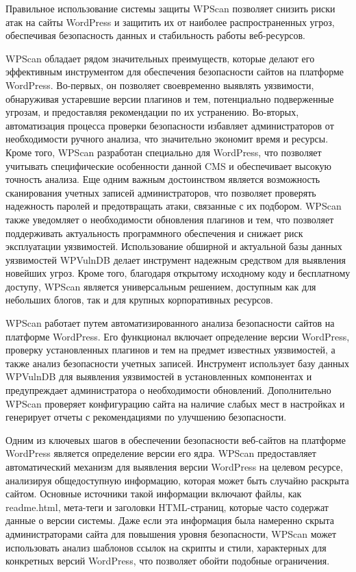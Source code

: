 \begin{multicols}{2}
Правильное использование системы защиты WPScan позволяет снизить риски
атак на сайты WordPress и защитить их от наиболее распространенных
угроз, обеспечивая безопасность данных и стабильность работы
веб-ресурсов.

WPScan обладает рядом значительных преимуществ, которые делают его
эффективным инструментом для обеспечения безопасности сайтов на
платформе WordPress. Во-первых, он позволяет своевременно выявлять
уязвимости, обнаруживая устаревшие версии плагинов и тем, потенциально
подверженные угрозам, и предоставляя рекомендации по их устранению.
Во-вторых, автоматизация процесса проверки безопасности избавляет
администраторов от необходимости ручного анализа, что значительно
экономит время и ресурсы. Кроме того, WPScan разработан специально для
WordPress, что позволяет учитывать специфические особенности данной CMS
и обеспечивает высокую точность анализа. Еще одним важным достоинством
является возможность сканирования учетных записей администраторов, что
позволяет проверять надежность паролей и предотвращать атаки, связанные
с их подбором. WPScan также уведомляет о необходимости обновления
плагинов и тем, что позволяет поддерживать актуальность программного
обеспечения и снижает риск эксплуатации уязвимостей. Использование
обширной и актуальной базы данных уязвимостей WPVulnDB делает инструмент
надежным средством для выявления новейших угроз. Кроме того, благодаря
открытому исходному коду и бесплатному доступу, WPScan является
универсальным решением, доступным как для небольших блогов, так и для
крупных корпоративных ресурсов.

WPScan работает путем автоматизированного анализа безопасности сайтов на
платформе WordPress. Его функционал включает определение версии
WordPress, проверку установленных плагинов и тем на предмет известных
уязвимостей, а также анализ безопасности учетных записей. Инструмент
использует базу данных WPVulnDB для выявления уязвимостей в
установленных компонентах и предупреждает администратора о необходимости
обновлений. Дополнительно WPScan проверяет конфигурацию сайта на наличие
слабых мест в настройках и генерирует отчеты с рекомендациями по
улучшению безопасности.

Одним из ключевых шагов в обеспечении безопасности веб-сайтов на
платформе WordPress является определение версии его ядра. WPScan
предоставляет автоматический механизм для выявления версии WordPress на
целевом ресурсе, анализируя общедоступную информацию, которая может быть
случайно раскрыта сайтом. Основные источники такой информации включают
файлы, как readme.html, мета-теги и заголовки HTML-страниц, которые
часто содержат данные о версии системы. Даже если эта информация была
намеренно скрыта администраторами сайта для повышения уровня
безопасности, WPScan может использовать анализ шаблонов ссылок на
скрипты и стили, характерных для конкретных версий WordPress, что
позволяет обойти подобные ограничения.


\end{multicols}
